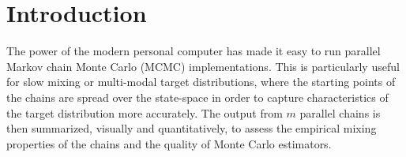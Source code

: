 \documentclass[11pt]{article}
\theoremstyle{remark}
\begin{document}







\section{Introduction} \label{sec:intro}

The power of the modern personal computer has made it easy to run parallel Markov chain Monte Carlo (MCMC) implementations. This is particularly useful for slow mixing or multi-modal target distributions, where the starting points of the chains are spread over the state-space in order to capture characteristics of the target distribution more accurately. The output from $m$ parallel chains is then summarized, visually and quantitatively, to assess the empirical mixing properties of the chains and the quality of Monte Carlo estimators.
\end{document}
